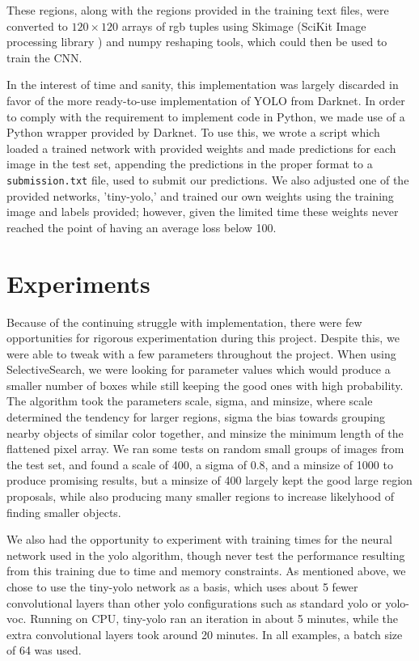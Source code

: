 \documentclass[10pt]{article}
\begin{document}
These regions, along with the regions provided in the training text files, were converted to $120\times 120$ arrays of rgb tuples using Skimage (SciKit Image processing library \cite{skimage}) and numpy reshaping tools, which could then be used to train the CNN.

In the interest of time and sanity, this implementation was largely discarded in favor of the more ready-to-use implementation of YOLO from Darknet. In order to comply with the requirement to implement code in Python, we made use of a Python wrapper provided by Darknet. To use this, we wrote a script which loaded a trained network with provided weights and made predictions for each image in the test set, appending the predictions in the proper format to a \texttt{submission.txt} file, used to submit our predictions. We also adjusted one of the provided networks, 'tiny-yolo,' and trained our own weights using the training image and labels provided; however, given the limited time these weights never reached the point of having an average loss below 100.

\section{Experiments}

Because of the continuing struggle with implementation, there were few opportunities for rigorous experimentation during this project. Despite this, we were able to tweak with a few parameters throughout the project. When using SelectiveSearch, we were looking for parameter values which would produce a smaller number of boxes while still keeping the good ones with high probability. The algorithm took the parameters scale, sigma, and minsize, where scale determined the tendency for larger regions, sigma the bias towards grouping nearby objects of similar color together, and minsize the minimum length of the flattened pixel array. We ran some tests on random small groups of images from the test set, and found a scale of 400, a sigma of 0.8, and a minsize of 1000 to produce promising results, but a minsize of 400 largely kept the good large region proposals, while also producing many smaller regions to increase likelyhood of finding smaller objects. 

We also had the opportunity to experiment with training times for the neural network used in the yolo algorithm, though never test the performance resulting from this training due to time and memory constraints. As mentioned above, we chose to use the tiny-yolo network as a basis, which uses about 5 fewer convolutional layers than other yolo configurations such as standard yolo or yolo-voc. Running on CPU, tiny-yolo ran an iteration in about 5 minutes, while the extra convolutional layers took around 20 minutes. In all examples, a batch size of 64 was used.
\end{document}
